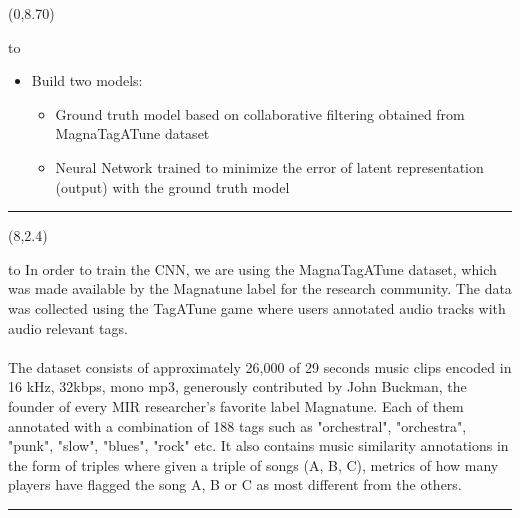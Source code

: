 \documentclass[a0]{a0poster}
\def\Head#1{
  \noindent\hbox to \hsize{\hfil{\LARGE\color{DarkBlue}\sf #1}}\bigskip}
\begin{document}
  \begin{textblock}{7}(0,8.70)
    \Head{Architecture}

    \sf
    \begin{itemize}
      \item Build two models:
      \begin{itemize}
        \item Ground truth model based on collaborative filtering obtained from
          MagnaTagATune dataset
        \item Neural Network trained to minimize the error of latent
          representation (output) with the ground truth model
      \end{itemize}
    \end{itemize}

    \bigskip
    \hrule
  \end{textblock}

  \begin{textblock}{7}(8,2.4)
    \Head{Dataset}
    \sf
    In order to train the CNN, we are using the MagnaTagATune dataset, which
    was made available by the Magnatune label for the research community. The
    data was collected using the TagATune game where users annotated audio
    tracks with audio relevant tags.
    \\ \\
    The dataset consists of approximately 26,000 of 29 seconds music clips
    encoded in 16 kHz, 32kbps, mono mp3, generously contributed by John
    Buckman, the founder of every MIR researcher's favorite label Magnatune.
    Each of them annotated with a combination of 188 tags such as "orchestral",
    "orchestra", "punk", "slow", "blues", "rock" etc. It also contains music
    similarity annotations in the form of triples where given a triple of songs
    (A, B, C), metrics of how many players have flagged the song A, B or C as
    most different from the others.

    \bigskip
    \hrule
  \end{textblock}
\end{document}
